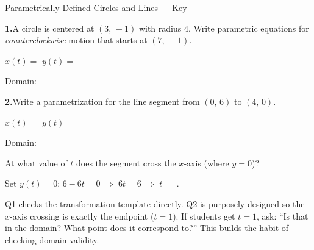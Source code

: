 \documentclass[10pt]{article}
\begin{document}
\namedateperiod

\vspace{0.12in}

\begin{notesbox}{Parametrically Defined Circles and Lines --- Key}

\textbf{1.}\quad A circle is centered at $(3,\,-1)$ with radius $4$.
Write parametric equations for \emph{counterclockwise} motion that
starts at $(7,\,-1)$.

\vspace{4pt}
$x(t) = $  \qquad $y(t) = $ 

\vspace{0.04in}
Domain: 

\vspace{0.22in}
\textbf{2.}\quad Write a parametrization for the line segment from
$(0,\,6)$ to $(4,\,0)$.

\vspace{4pt}
$x(t) = $  \qquad $y(t) = $ 

\vspace{0.04in}
Domain: 

\vspace{0.16in}
At what value of $t$ does the segment cross the $x$-axis (where $y=0$)?

\vspace{4pt}
Set $y(t) = 0$: $6 - 6t = 0 \;\Rightarrow\; 6t = 6 \;\Rightarrow\; t = $ .


\begin{teachernote}
  Q1 checks the transformation template directly. Q2 is purposely designed
  so the $x$-axis crossing is exactly the endpoint ($t=1$). If students
  get $t=1$, ask: ``Is that in the domain? What point does it correspond
  to?'' This builds the habit of checking domain validity.
\end{teachernote}

\end{notesbox}
\end{document}
